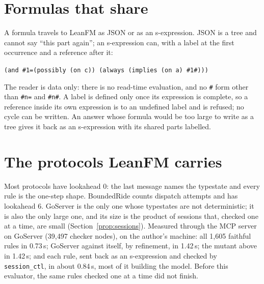 \section{Formulas that share}

A formula travels to LeanFM as JSON or as an s-expression. JSON is a tree and cannot
say ``this part again''; an s-expression can, with a label at the first occurrence and a
reference after it:
\begin{center}
\texttt{(and \#1=(possibly (on c)) (always (implies (on a) \#1\#)))}
\end{center}
The reader is data only: there is no read-time evaluation, and no \texttt{\#} form other
than \texttt{\#n=} and \texttt{\#n\#}. A label is defined only once its expression is
complete, so a reference inside its own expression is to an undefined label and is
refused; no cycle can be written. An answer whose formula would be too large to write
as a tree gives it back as an s-expression with its shared parts labelled.

\section{The protocols LeanFM carries}

\begin{table}[ht]
\centering
{}
\caption{Faithful CTL of the protocols in this repository: checker nodes, typestates,
lookahead, rules (one per typestate and one for the start) and whether the typestates
are deterministic.}
\label{tab:corpus}
\end{table}

Most protocols have lookahead $0$: the last message names the typestate and every rule
is the one-step shape. BoundedRide counts dispatch attempts and has lookahead $6$.
GoServer is the only one whose typestates are not deterministic; it is also the only
large one, and its size is the product of sessions that, checked one at a time, are
small (Section~\ref{prop:sessions}).
Measured through the MCP server on GoServer (39{,}497 checker nodes), on the author's
machine: all 1{,}605 faithful rules in 0.73\,s; GoServer against itself, by
refinement, in 1.42\,s; the mutant above in 1.42\,s; and each rule, sent back as an
s-expression and checked by \texttt{session\_ctl}, in about 0.84\,s, most of it building
the model. Before this evaluator, the same rules checked one at a time did not finish.
